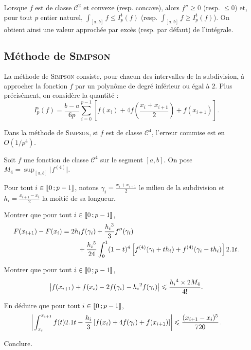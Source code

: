 \begin{remarque}\label{remarquemethodetrapezes}
Lorsque $f$ est de classe $\mathscr{C}^2$ et convexe (resp. concave), alors $f'' \geqslant 0$ (resp. $\leqslant 0$) et, pour tout $p$ entier naturel, \mbox{$\int_{[a,b]} f \leqslant I_p^\mathrm{t}(f)$} (resp. \mbox{$\int_{[a,b]} f \geqslant I_p^\mathrm{t}(f)$}). On obtient ainsi une valeur approchée par excès (resp. par défaut) de l'intégrale.
\end{remarque}

\subsection{Méthode de \textsc{Simpson}}

La méthode de \textsc{Simpson} consiste, pour chacun des intervalles de la subdivision, à approcher la fonction $f$ par un polynôme de degré inférieur ou égal à $2$. Plus précisément, on considère la quantité :
\[
I_p^\mathrm{s}(f) = \frac{b-a}{6 p} \sum_{i=0}^{p-1} \left[f(x_i)+ 4 f\left(\frac{x_i + x_{i+1}}{2}\right) + f(x_{i+1})\right].
\]

\begin{prop}
Dans la méthode de \textsc{Simpson}, si $f$ est de classe $\mathscr{C}^4$, l'erreur commise est en $O(1/p^4)$.
\end{prop}


\begin{exercice}
Soit $f$ une fonction de classe $\mathscr{C}^4$ sur le segment $[a, b]$. On pose $M_4 = \sup_{[a,b]} \big\vert f^{(4)} \big\vert$.

Pour tout $i \in \llbracket 0\,; p-1 \rrbracket$, notons $\gamma_i = \frac{x_i + x_{i+1}}{2}$ le milieu de la subdivision et $h_i = \frac{x_{i+1} - x_i}{2}$ la moitié de sa longueur.
\begin{questions}
\item Montrer que pour tout $i \in \llbracket 0\,; p-1 \rrbracket$,
\[
F(x_{i+1}) - F(x_i)
= \begin{multlined}[t] 
2 h_i f(\gamma_i) + \frac{h_i{}^3}{3} f''(\gamma_i) \\
+ \frac{h_i{}^5}{24} \int_0^1 (1 - t)^4 \left[f^{(4)}(\gamma_i + t h_i) + f^{(4)}(\gamma_i - t h_i)\right] \d t.
\end{multlined} 
\]

\item Montrer que pour tout $i \in \llbracket 0\,; p-1 \rrbracket$,
\[
\left| f(x_{i+1}) + f(x_i) - 2 f(\gamma_i) - h_i{}^2 f(\gamma_i) \right| \leqslant \frac{h_i{}^4 \times 2 M_4}{4!}.
\]

\item En déduire que pour tout $i \in \llbracket 0\,; p-1 \rrbracket$,
\[
\left| \int_{x_i}^{x_{i+1}} f(t) 2.1 t - \frac{h_i}{3} \left[f(x_i) + 4 f(\gamma_i) + f(x_{i+1})\right] \right|
\leqslant \frac{(x_{i+1} - x_i)^5}{720}.
\]

\item Conclure.
\end{questions}
\end{exercice}

